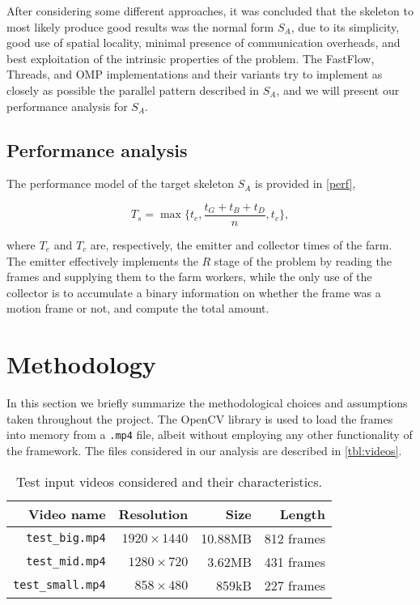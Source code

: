 \documentclass{article}
\begin{document}
After considering some different approaches, it was concluded that the skeleton to most likely produce good results was the normal form $S_A$, due to its simplicity, good use of spatial locality, minimal presence of communication overheads, and best exploitation of the intrinsic properties of the problem. The \textsf{FastFlow}, \textsf{Threads}, and \textsf{OMP} implementations and their variants try to implement as closely as possible the parallel pattern described in $S_A$, and we will present our performance analysis for $S_A$.

\subsection{Performance analysis}\label{sec:perfanalysis}

The performance model of the target skeleton $S_A$ is provided in \autoref{perf},

\begin{equation}\label{perf}
T_s = \max\{t_e,\frac{t_G + t_B + t_D}{n},t_c\},
\end{equation}

where $T_e$ and $T_c$ are, respectively, the emitter and collector times of the farm. The emitter effectively implements the $R$ stage of the problem by reading the frames and supplying them to the farm workers, while the only use of the collector is to accumulate a binary information on whether the frame was a motion frame or not, and compute the total amount.

\section{Methodology}\label{sec:methodology}

In this section we briefly summarize the methodological choices and assumptions taken throughout the project. The OpenCV library is used to load the frames into memory from a \texttt{.mp4} file, albeit without employing any other functionality of the framework. The files considered in our analysis are described in \autoref{tbl:videos}.

\begin{table}[H]
\centering
\begin{tabular}{r||r|r|r}
\hline
   \textbf{Video name} & \textbf{Resolution} & \textbf{Size} & \textbf{Length}\\
\hline
   \texttt{test\_big.mp4}   & $1920 \times 1440$ & 10.88MB & 812 frames \\
   \texttt{test\_mid.mp4}   & $1280 \times 720$ & 3.62MB & 431 frames \\
   \texttt{test\_small.mp4} & $858 \times 480$ & 859kB & 227 frames \\
  \hline
  \end{tabular}
\caption{Test input videos considered and their characteristics.}
\label{tbl:videos}
\end{table}
\end{document}
